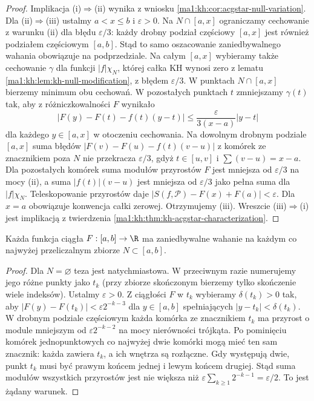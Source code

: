 \begin{proof}
Implikacja (i)$\Rightarrow$(ii) wynika z wniosku
\ref{ma1:kh:cor:acgstar-null-variation}.
Dla (ii)$\Rightarrow$(iii) ustalmy $a<x\le b$ i
$\varepsilon>0$. Na $N\cap[a,x]$ ograniczamy cechowanie z warunku (ii)
dla błędu $\varepsilon/3$: każdy drobny podział częściowy
$[a,x]$ jest również podziałem częściowym $[a,b]$.
Stąd to samo oszacowanie zaniedbywalnego wahania
obowiązuje na podprzedziale.
Na całym $[a,x]$ wybieramy także cechowanie $\gamma$
dla funkcji $|f|\chi_N$, której całka KH wynosi zero
z lematu \ref{ma1:kh:lem:kh-null-modification}, z błędem
$\varepsilon/3$. W punktach $N\cap[a,x]$ bierzemy
minimum obu cechowań. W pozostałych punktach $t$
zmniejszamy $\gamma(t)$ tak, aby z różniczkowalności
$F$ wynikało
\[
 |F(y)-F(t)-f(t)(y-t)|
 \le \frac{\varepsilon}{3(x-a)}|y-t|
\]
dla każdego $y\in[a,x]$ w otoczeniu cechowania.
Na dowolnym drobnym podziale $[a,x]$ suma błędów
$|F(v)-F(u)-f(t)(v-u)|$ z komórek ze znacznikiem
poza $N$ nie przekracza $\varepsilon/3$, gdyż
$t\in[u,v]$ i $\sum(v-u)=x-a$.
Dla pozostałych komórek suma modułów przyrostów
$F$ jest mniejsza od $\varepsilon/3$ na mocy (ii),
a suma $|f(t)|(v-u)$ jest mniejsza od $\varepsilon/3$
jako pełna suma dla $|f|\chi_N$.
Teleskopowanie przyrostów daje
$|S(f,\mathcal P)-F(x)+F(a)|<\varepsilon$.
Dla $x=a$ obowiązuje konwencja całki zerowej.
Otrzymujemy (iii). Wreszcie (iii)$\Rightarrow$(i)
jest implikacją z twierdzenia
\ref{ma1:kh:thm:kh-acgstar-characterization}.
\end{proof}

\begin{wniosek}
\label{it:cor:denjoy-countable-variation}
Każda funkcja ciągła $F:[a,b]\to\R$ ma zaniedbywalne
wahanie na każdym co najwyżej przeliczalnym zbiorze
$N\subset[a,b]$.
\end{wniosek}
\begin{proof}
Dla $N=\varnothing$ teza jest natychmiastowa. W przeciwnym
razie numerujemy jego różne punkty jako $t_k$ (przy zbiorze
skończonym bierzemy tylko skończenie wiele indeksów).
Ustalmy $\varepsilon>0$. Z ciągłości $F$ w $t_k$ wybieramy
$\delta(t_k)>0$ tak, aby $|F(y)-F(t_k)|<
\varepsilon 2^{-k-3}$ dla $y\in[a,b]$ spełniających
$|y-t_k|<\delta(t_k)$.
W drobnym podziale częściowym każda komórka ze znacznikiem
$t_k$ ma przyrost o module mniejszym od
$\varepsilon 2^{-k-2}$ na mocy nierówności trójkąta.
Po pominięciu komórek jednopunktowych co najwyżej dwie
komórki mogą mieć ten sam znacznik: każda zawiera $t_k$,
a ich wnętrza są rozłączne. Gdy występują dwie, punkt
$t_k$ musi być prawym końcem jednej i lewym końcem drugiej.
Stąd suma modułów wszystkich przyrostów jest nie większa
niż $\varepsilon\sum_{k\ge1}2^{-k-1}=\varepsilon/2$.
To jest żądany warunek.
\end{proof}

